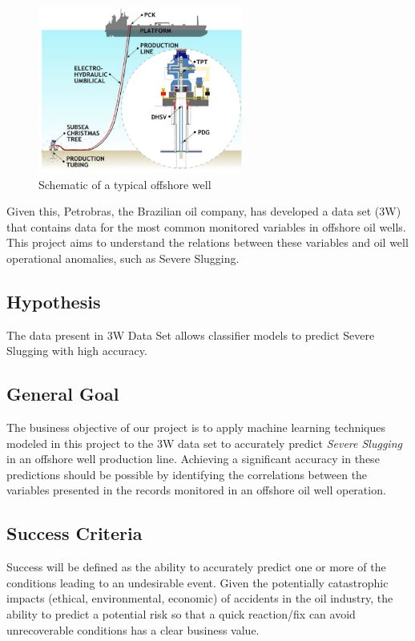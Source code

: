 \documentclass{article}
\begin{document}
\begin{figure}
\centering
\includegraphics[width=0.6\textwidth]{offshore_well.png}
\caption{\label{fig:offshore_well}Schematic of a typical offshore well}
\end{figure}

Given this, Petrobras, the Brazilian oil company, has developed a data set (3W) that contains data for the most common monitored variables in offshore oil wells. This project aims to understand the relations between these variables and oil well operational anomalies, such as Severe Slugging.

\subsection{Hypothesis}
The data present in 3W Data Set allows classifier models to predict Severe Slugging with high accuracy.

\subsection{General Goal}
The business objective of our project is to apply machine learning techniques modeled in this project to the 3W data set to accurately predict \emph{Severe Slugging} in an offshore well production line. Achieving a significant accuracy in these predictions should be possible by identifying the correlations between the variables presented in the records monitored in an offshore oil well operation. 


\subsection{Success Criteria}
Success will be defined as the ability to accurately predict one or more of the conditions leading to an undesirable event. Given the potentially catastrophic impacts (ethical, environmental, economic) of accidents in the oil industry, the ability to predict a potential risk so that a quick reaction/fix can avoid unrecoverable conditions has a clear business value.
\end{document}
